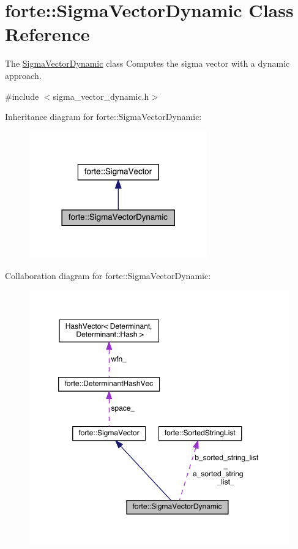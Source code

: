 \hypertarget{classforte_1_1_sigma_vector_dynamic}{}\section{forte\+:\+:Sigma\+Vector\+Dynamic Class Reference}
\label{classforte_1_1_sigma_vector_dynamic}


The \mbox{\hyperlink{classforte_1_1_sigma_vector_dynamic}{Sigma\+Vector\+Dynamic}} class Computes the sigma vector with a dynamic approach.  




{\ttfamily \#include $<$sigma\+\_\+vector\+\_\+dynamic.\+h$>$}



Inheritance diagram for forte\+:\+:Sigma\+Vector\+Dynamic\+:
\nopagebreak
\begin{figure}[H]
\begin{center}
\leavevmode
\includegraphics[width=218pt]{classforte_1_1_sigma_vector_dynamic__inherit__graph}
\end{center}
\end{figure}


Collaboration diagram for forte\+:\+:Sigma\+Vector\+Dynamic\+:
\nopagebreak
\begin{figure}[H]
\begin{center}
\leavevmode
\includegraphics[width=350pt]{classforte_1_1_sigma_vector_dynamic__coll__graph}
\end{center}
\end{figure}
